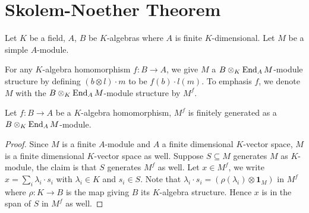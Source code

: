\chapter{Skolem-Noether Theorem}

Let $K$ be a field, $A$, $B$ be $K$-algebras where $A$ is finite $K$-dimensional. Let $M$ be a simple $A$-module.

\begin{construction}
  For any $K$-algebra homomorphism $f : B \to A$, we give $M$ a $B \otimes_{K}\operatorname{End}_{A}M$-module structure by defining $(b\otimes l)\cdot m$ to be $f(b)\cdot l(m)$. To emphasis $f$, we denote $M$ with the $B\otimes_{K}\operatorname{End}_{A}M$-module structure by $M^{f}$.
  \leanok
\end{construction}

\begin{lemma}
  Let $f : B \to A$ be a $K$-algebra homomorphism, $M^{f}$ is finitely generated as a $B\otimes_{K}\operatorname{End}_{A}M$-module.
  \leanok
\end{lemma}
\begin{proof}
  Since $M$ is a finite $A$-module and $A$ a finite dimensional $K$-vector space, $M$ is a finite dimensional $K$-vector space as well. Suppose $S \subseteq M$ generates $M$ as $K$-module, the claim is that $S$ generates $M^{f}$ as well. Let $x \in M^{f}$, we write $x = \sum_{i}\lambda_{i}\cdot s_{i}$ with $\lambda_{i}\in K$ and $s_{i}\in S$.
  Note that $\lambda_{i}\cdot s_{i} = (\rho(\lambda_{i})\otimes\mathbf{1}_{M})$ in $M^{f}$ where $\rho : K \to B$ is the map giving $B$ its $K$-algebra structure. Hence $x$ is in the span of $S$ in $M^{f}$ as well.
\end{proof}


